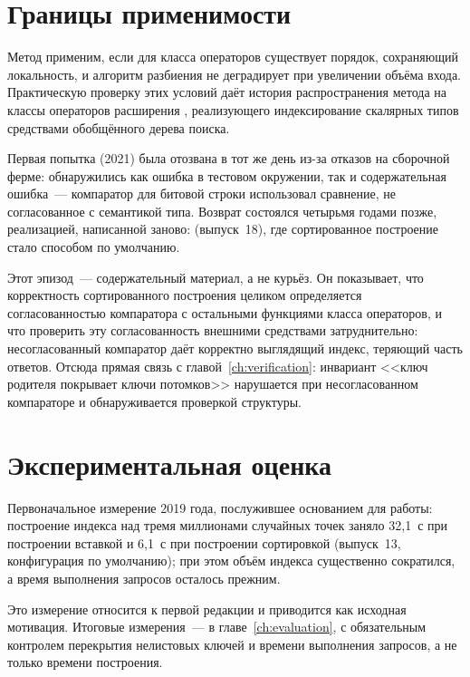 \section{Границы применимости}
\label{sec:sorted-limits}

Метод применим, если для класса операторов существует порядок, сохраняющий
локальность, и алгоритм разбиения не деградирует при увеличении объёма входа.
Практическую проверку этих условий даёт история распространения метода на
классы операторов расширения , реализующего индексирование
скалярных типов средствами обобщённого дерева поиска.

Первая попытка (2021) была отозвана в тот же день из-за отказов на сборочной
ферме: обнаружились как ошибка в тестовом окружении, так и содержательная
ошибка~--- компаратор для битовой строки использовал сравнение, не согласованное
с семантикой типа. Возврат состоялся четырьмя годами позже, реализацией,
написанной заново:  (выпуск~18), где сортированное построение стало способом по
умолчанию.

Этот эпизод~--- содержательный материал, а не курьёз. Он показывает, что
корректность сортированного построения целиком определяется согласованностью
компаратора с остальными функциями класса операторов, и что проверить эту
согласованность внешними средствами затруднительно: несогласованный компаратор
даёт корректно выглядящий индекс, теряющий часть ответов. Отсюда прямая связь с
главой~\ref{ch:verification}: инвариант <<ключ родителя покрывает ключи
потомков>> нарушается при несогласованном компараторе и обнаруживается проверкой
структуры.

\section{Экспериментальная оценка}

Первоначальное измерение 2019 года, послужившее основанием для работы: построение индекса
над тремя миллионами случайных точек заняло 32,1~с при построении вставкой и
6,1~с при построении сортировкой (выпуск~13, конфигурация по умолчанию); при
этом объём индекса существенно сократился, а время выполнения запросов осталось
прежним.

Это измерение относится к первой редакции и приводится как исходная мотивация.
Итоговые измерения~--- в главе~\ref{ch:evaluation}, с обязательным контролем
перекрытия нелистовых ключей и времени выполнения запросов, а не только времени
построения.

